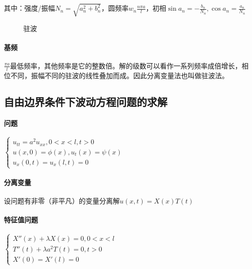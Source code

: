 其中：强度/振幅\(N_n=\sqrt{a_n^2+b_n^2}\)，圆频率\( w_n\frac{n\pi a}{l}\)，初相\(\sin a_n=-\frac{b_n}{N_n},\cos a_n=\frac{a_n}{N_n}\)

\begin{figure}[htbp]
    \centering
    \caption{驻波}\label{pic:stop}
\end{figure}

\paragraph{基频}\(\frac{\pi a}{l}\)最低频率，其他频率是它的整数倍。解的级数可以看作一系列频率成倍增长，相位不同，振幅不同的驻波的线性叠加而成。因此分离变量法也叫做驻波法。

\subsection{自由边界条件下波动方程问题的求解}

\paragraph{问题}\(\begin{cases}
u_{tt}=a^2u_{xx},0<x<l,t>0\\
u(x,0)=\phi(x),u_t(x)=\psi(x)\\
u_x(0,t)=u_x(l,t)=0
\end{cases}\)

\paragraph{分离变量}设问题有非零（非平凡）的变量分离解\(u(x,t)=X(x)T(t)\)

\paragraph{特征值问题}\(\begin{cases}X''(x)+\lambda X(x)=0,0<x<l\\
T''(t)+\lambda a^2T(t)=0,t>0\\
X'(0)=X'(l)=0\end{cases}\)

